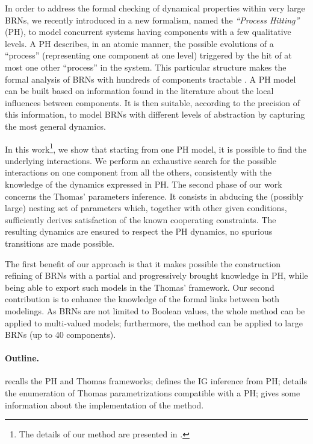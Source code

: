 In order to address the formal checking of dynamical properties within very large BRNs, we recently
introduced in \cite{PMR10-TCSB} a new formalism, named the \emph{``Process Hitting''} (PH), to model
concurrent systems having components with a few qualitative levels.
A PH describes, in an atomic manner, the possible evolutions of a “process” (representing one
component at one level) triggered by the hit of at most one other “process” in the system.
This particular structure makes the formal analysis of BRNs with hundreds of components tractable \cite{PMR12-MSCS}.
A PH model can be built based on information found in the literature about the local influences between components.
It is then suitable, according to the precision of this information, to model BRNs with different levels of abstraction by capturing the most general dynamics.

In this work\footnote{The details of our method are presented in \cite{FPIMR12-CMSB}.}, we show that starting from one PH model, it is possible to find the underlying interactions.
We perform an exhaustive search for the possible interactions on one component from all the
others, consistently with the knowledge of the dynamics expressed in PH.
The second phase of our work concerns the Thomas' parameters inference.
It consists in abducing the (possibly large) nesting set of parameters which, together with other given conditions, sufficiently derives satisfaction of the known cooperating constraints.
The resulting dynamics are ensured to respect the PH dynamics, \ie no spurious transitions are
made possible.

The first benefit of our approach is that it makes possible the construction refining of BRNs with a partial and progressively brought knowledge in PH, while being able to export such models in the Thomas' framework.
Our second contribution is to enhance the knowledge of the formal links between both modelings.
As BRNs are not limited to Boolean values, the whole method can be applied to multi-valued models;
furthermore, the method can be applied to large BRNs (up to 40 components).

\paragraph{Outline.}
 recalls the PH and Thomas frameworks;
 defines the IG inference from PH;
 details the enumeration of Thomas parametrizations compatible with a PH;
 gives some information about the implementation of the method.
